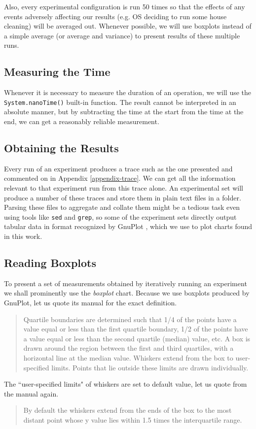 Also, every experimental configuration is run 50 times so that the effects of any events adversely affecting our results (e.g. OS deciding to run some house cleaning) will be averaged out. Whenever possible, we will use boxplots instead of a simple average (or average and variance) to present results of these multiple runs.

\subsection{Measuring the Time}

Whenever it is necessary to measure the duration of an operation, we will use the \texttt{System.nanoTime()} built-in function. The result cannot be interpreted in an absolute manner, but by subtracting the time at the start from the time at the end, we can get a reasonably reliable measurement.

\subsection{Obtaining the Results}

Every run of an experiment produces a trace such as the one presented and commented on in Appendix \ref{appendix-trace}. We can get all the information relevant to that experiment run from this trace alone. An experimental set will produce a number of these traces and store them in plain text files in a folder. Parsing these files to aggregate and collate them might be a tedious task even using tools like \texttt{sed} and \texttt{grep}, so some of the experiment sets directly output tabular data in format recognized by GnuPlot \cite{gnuplot}, which we use to plot charts found in this work.

\subsection{Reading Boxplots}

To present a set of measurements obtained by iteratively running an experiment we shall prominently use the \textit{boxplot} chart. Because we use boxplots produced by GnuPlot, let us quote its manual \cite{gnuplot-manual} for the exact definition.

\begin{quote}
Quartile boundaries are determined such that 1/4 of the points have a value equal or less than the first quartile boundary, 1/2 of the points have a value equal or less than the second quartile (median) value, etc. A box is drawn around the region between the first and third quartiles, with a horizontal line at the median value. Whiskers extend from the box to user-specified limits. Points that lie outside these limits are drawn individually.
\end{quote}

The ``user-specified limits" of whiskers are set to default value, let us quote from the manual again.

\begin{quote}
By default the whiskers extend from the ends of the box to the most distant point whose y value lies within 1.5 times the interquartile range.
\end{quote}